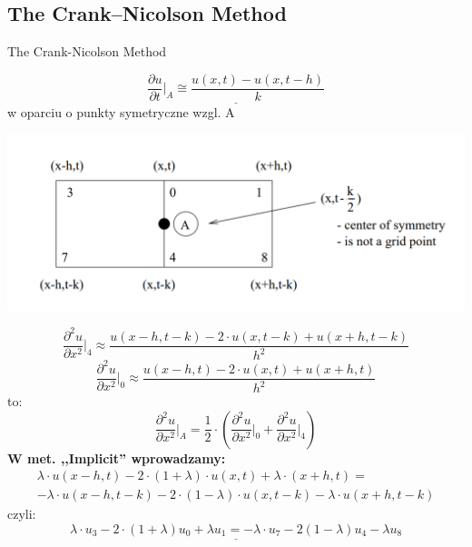 
\subsection{The Crank--Nicolson Method}
\begin{frame}{The Crank-Nicolson Method}

\begin{block}{}
 \end{block}
 
\begin{equation}\underline{\frac{\partial u}{\partial t} \Big \vert _{A}\cong \frac{u(x,t) - u(x,t - h)}{k}}\end{equation} w oparciu o punkty symetryczne wzgl. A
 
 \centerline{\includegraphics[width = 1 \linewidth]{img/23/crank}}
\end{frame}

\begin{frame}
\begin{equation} \frac{\partial ^2 u}{\partial x^2} \Big \vert _{4}\approx \frac{u(x - h,t - k) - 2 \cdot u(x,t - k) + u(x + h, t - k)}{h^2}\end{equation}
\begin{equation} \frac{\partial ^2 u}{\partial x^2} \Big \vert _{0}\approx \frac{u(x - h,t) - 2 \cdot u(x,t) + u(x + h, t)}{h^2} \end{equation}
to:
\begin{equation} \frac{\partial ^2 u}{\partial x^2} \big \vert _{A} = \frac{1}{2} \cdot \left ( \frac{\partial ^2 u}{\partial x^2} \Big \vert _{0} + \frac{\partial ^2 u}{\partial x^2} \Big \vert _{4} \right )\end{equation}
\textbf{W met. ,,Implicit'' wprowadzamy:}
\begin{multline} \lambda \cdot u(x-h,t) - 2 \cdot (1+\lambda)\cdot u(x,t) + \lambda \cdot (x+h,t) = \\
 -\lambda \cdot u(x-h,t-k) - 2 \cdot (1-\lambda) \cdot u(x,t-k) - \lambda \cdot u(x+h,t-k)\end{multline}
czyli:
$$ \underline{\lambda \cdot u_3 - 2\cdot (1+\lambda)u_0 + \lambda u_1 = -\lambda \cdot u_7 - 2(1-\lambda)u_4 - \lambda u_8}$$
\end{frame}